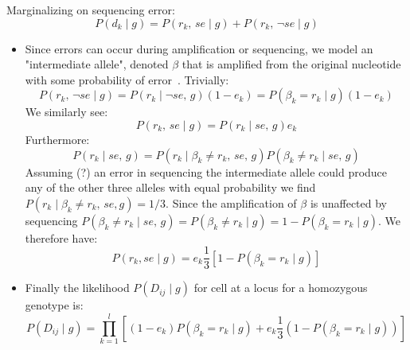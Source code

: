 \documentclass[../../main.tex]{subfiles}
\begin{document}
Marginalizing on sequencing error:
\begin{equation*}
    P(d_k \mid g) =  P(r_k,\,se \mid g) + P(r_k,\,\neg se \mid g)
\end{equation*}
\begin{itemize}
    \item Since errors can occur during amplification or sequencing, we model an "intermediate allele", denoted $\beta$ that is amplified from the original nucleotide with some probability of error~\cite{monovar}. Trivially:
    \begin{equation*}
        P(r_k,\,\neg se \mid g) = P(r_k\mid \neg se ,\, g)(1-e_k)=P(\beta_k=r_k\mid g)(1-e_k) 
    \end{equation*}
    We similarly see:
    \begin{equation*}
        P(r_k,\, se \mid g) = P(r_k\mid se,\, g)e_k
    \end{equation*}
    Furthermore:
    \begin{equation*}
        P(r_k\mid se,\, g) = P(r_k\mid \beta_k\neq r_k,\,se,\,g) P(\beta_k\neq r_k \mid se,\,g)
    \end{equation*}
     Assuming (?) an error in sequencing the intermediate allele could produce any of the other three alleles with equal probability we find $P(r_k\mid \beta_k \neq r_k,\,se,g)=1/3$. Since the amplification of $\beta$ is unaffected by sequencing $P(\beta_k\neq r_k \mid se,\,g)=P(\beta_k\neq r_k\mid g)=1-P(\beta_k=r_k\mid g)$. We therefore have:
     \begin{equation*}
         P(r_k, se \mid g) = e_k \frac{1}{3}\left[1-P(\beta_k=r_k\mid g)\right]
     \end{equation*}
     \item Finally the likelihood $P(D_{ij}\mid g)$ for cell at a locus for a homozygous genotype is:
     \begin{equation}
          P(D_{ij}\mid g) = \prod_{k=1}^l \left[ (1-e_k)P(\beta_k=r_k\mid g) + e_k \frac{1}{3} (1-P(\beta_k=r_k\mid g)) \right]
     \end{equation}
\end{itemize}
\end{document}
